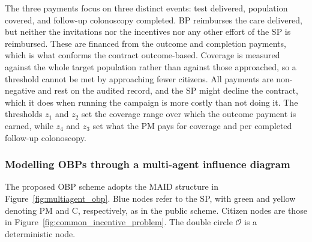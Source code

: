 \documentclass[12pt]{article}
\begin{document}
The three payments focus on three distinct events: test delivered, population covered, and follow-up colonoscopy completed. BP reimburses the care delivered, but neither the invitations nor the incentives nor any other effort of the SP is reimbursed. These are financed from the outcome and completion payments, which is what conforms the contract outcome-based. Coverage is measured against the whole target population rather than against those approached, so a threshold cannot be met by approaching fewer citizens. All payments are non-negative and rest on the audited record, and the SP might decline the contract, which it does when running the campaign is more costly than not doing it. The thresholds $z_1$ and $z_2$ set the coverage range over which the outcome payment is earned, while $z_4$ and $z_3$ set what the PM pays for coverage and per completed follow-up colonoscopy.



\subsubsection{Modelling OBPs through a multi-agent influence diagram}
The proposed OBP scheme adopts the MAID structure in Figure~\ref{fig:multiagent_obp}. Blue nodes refer to the SP, with green and yellow denoting PM and C, respectively, as in the public scheme. Citizen nodes are those in Figure~\ref{fig:common_incentive_problem}. The double circle $\mathcal{O}$ is a deterministic node.
\end{document}

